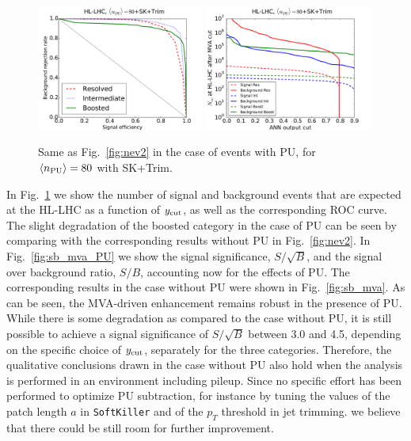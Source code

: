 \begin{figure}[t]
  \begin{center}
    \includegraphics[width=0.49\textwidth]{plots/roc_SKPU80.pdf}
\includegraphics[width=0.49\textwidth]{plots/nev2_SKPU80.pdf}
\caption{\small Same as Fig.~\ref{fig:nev2} in the
case of events with PU, for
$\left\langle n_{\rm PU}\right\rangle=80$ with SK+Trim.
}
\label{fig:nev2_PU}
\end{center}
\end{figure}

In Fig.~\ref{fig:nev2_PU}
we show the number of signal and background events that
are expected at the HL-LHC as a function of
$y_{\rm cut}$, as well as the corresponding ROC curve.
%
The slight degradation of the boosted category in the case
of PU can be seen by comparing with the corresponding
results without PU in Fig.~\ref{fig:nev2}.
%
In Fig.~\ref{fig:sb_mva_PU} we show the signal significance,
$S/\sqrt{B}$, and the signal over background ratio,
$S/B$, accounting now for the effects of PU.
%
The corresponding results in the case without PU were shown in
Fig.~\ref{fig:sb_mva}.
%
As can be seen, the MVA-driven enhancement remains robust in the
presence of PU.
%
While
there is some degradation as compared to the case
without PU,
it is still possible to
achieve a signal significance of
 $S/\sqrt{B}$ between 3.0 and 4.5, depending on the
specific choice of $y_{\rm cut}$,
separately for the three categories.
%
Therefore, the qualitative conclusions drawn
in the case without PU also hold when the analysis
is performed in an environment including pileup.
%
Since no specific effort has been performed to
optimize PU subtraction, for instance by tuning the values
of the patch length $a$ in {\tt SoftKiller}
and of the $p_T$ threshold in jet trimming.
we believe that
there could be still room for further  improvement.


